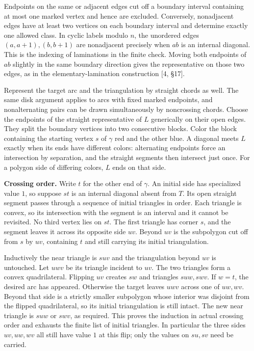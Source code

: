 \documentclass[11pt]{article}
\begin{document}
Endpoints on the same or adjacent edges cut off a boundary interval containing at most one marked vertex and hence are excluded. Conversely, nonadjacent edges have at least two vertices on each boundary interval and determine exactly one allowed class. In cyclic labels modulo \(n\), the unordered edges \((a,a+1),(b,b+1)\) are nonadjacent precisely when \(ab\) is an internal diagonal. This is the indexing of laminations in the finite check. Moving both endpoints of \(ab\) slightly in the same boundary direction gives the representative on those two edges, as in the elementary-lamination construction [4, \S17].

Represent the target arc and the triangulation by straight chords as well. The same disk argument applies to arcs with fixed marked endpoints, and nonalternating pairs can be drawn simultaneously by noncrossing chords. Choose the endpoints of the straight representative of \(L\) generically on their open edges. They split the boundary vertices into two consecutive blocks. Color the block containing the starting vertex \(s\) of \(\gamma\) red and the other blue. A diagonal meets \(L\) exactly when its ends have different colors: alternating endpoints force an intersection by separation, and the straight segments then intersect just once. For a polygon side of differing colors, \(L\) ends on that side.

\textbf{Crossing order.} Write \(t\) for the other end of \(\gamma\). An initial side has specialized value \(1\), so suppose \(st\) is an internal diagonal absent from \(T\). Its open straight segment passes through a sequence of initial triangles in order. Each triangle is convex, so its intersection with the segment is an interval and it cannot be revisited. No third vertex lies on \(st\). The first triangle has corner \(s\), and the segment leaves it across its opposite side \(uv\). Beyond \(uv\) is the subpolygon cut off from \(s\) by \(uv\), containing \(t\) and still carrying its initial triangulation.

Inductively the near triangle is \(suv\) and the triangulation beyond \(uv\) is untouched. Let \(uwv\) be its triangle incident to \(uv\). The two triangles form a convex quadrilateral. Flipping \(uv\) creates \(sw\) and triangles \(suw,swv\). If \(w=t\), the desired arc has appeared. Otherwise the target leaves \(uwv\) across one of \(uw,wv\). Beyond that side is a strictly smaller subpolygon whose interior was disjoint from the flipped quadrilateral, so its initial triangulation is still intact. The new near triangle is \(suw\) or \(swv\), as required. This proves the induction in actual crossing order and exhausts the finite list of initial triangles. In particular the three sides \(uv,uw,wv\) all still have value \(1\) at this flip; only the values on \(su,sv\) need be carried.
\end{document}
